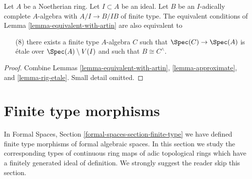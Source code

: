 \begin{lemma}
\label{lemma-approximate-by-etale-over-complement}
Let $A$ be a Noetherian ring. Let $I \subset A$ be an ideal.
Let $B$ be an $I$-adically complete $A$-algebra with $A/I \to B/IB$
of finite type. The equivalent conditions of
Lemma \ref{lemma-equivalent-with-artin} are also equivalent to
\begin{enumerate}
\item[(8)]
\label{item-algebraize}
there exists a finite type $A$-algebra $C$ such that
$\Spec(C) \to \Spec(A)$ is \'etale over $\Spec(A) \setminus V(I)$
and such that $B \cong C^\wedge$.
\end{enumerate}
\end{lemma}

\begin{proof}
Combine Lemmas \ref{lemma-equivalent-with-artin}, \ref{lemma-approximate}, and
\ref{lemma-rig-etale}. Small detail omitted.
\end{proof}




\section{Finite type morphisms}
\label{section-finite-type}

\noindent
In Formal Spaces, Section \ref{formal-spaces-section-finite-type}
we have defined finite type morphisms of formal algebraic spaces.
In this section we study the corresponding types of continuous
ring maps of adic topological rings which have a finitely generated
ideal of definition. We strongly suggest the reader skip this section.


